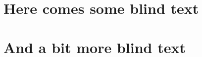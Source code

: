 \documentclass[
 	a4paper,
	twoside,
]{scrreprt}
\begin{document}
    
    \chapter{Here comes some blind text}
    \blindtext[2]
    
    \Blindtext
    
    \chapter{And a bit more blind text}
    \Blindtext[3][2]
    
    \thispagestyle{plain.scrheadings}
    \blindtext[4]
\end{document}
